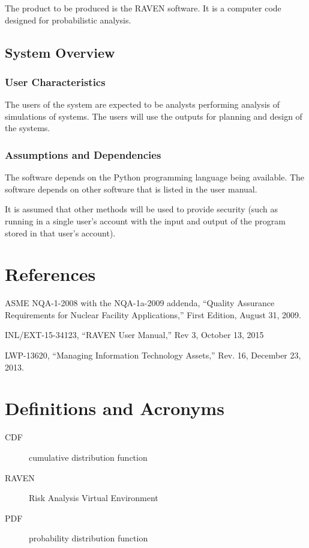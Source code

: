 \documentclass{article}
\begin{document}
The product to be produced is the RAVEN software.  It is a computer
code designed for probabilistic analysis.

\subsection{System Overview}

\subsubsection{User Characteristics}

The users of the system are expected to be analysts performing
analysis of simulations of systems.  The users will use the outputs
for planning and design of the systems.

\subsubsection{Assumptions and Dependencies}

The software depends on the Python programming language being
available.  The software depends on other software that is listed in
the user manual.

It is assumed that other methods will be used to provide security
(such as running in a single user's account with the input and output
of the program stored in that user's account).

\section{References}

\begin{flushleft}
ASME NQA-1-2008 with the NQA-1a-2009 addenda, ``Quality Assurance
Requirements for Nuclear Facility Applications,'' First Edition, August
31, 2009.

INL/EXT-15-34123, ``RAVEN User Manual,'' Rev 3, October 13, 2015

LWP-13620, ``Managing Information Technology Assets,'' Rev. 16, December
23, 2013.
\end{flushleft}

\section{Definitions and Acronyms}

\begin{description}
\item[CDF] cumulative distribution function
\item[RAVEN] Risk Analysis Virtual Environment
\item[PDF] probability distribution function
\end{description}
\end{document}
